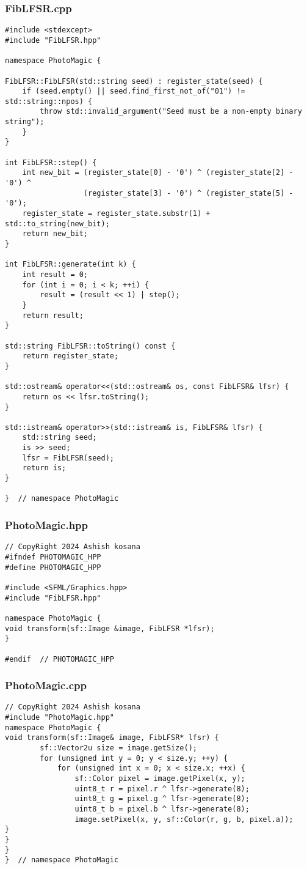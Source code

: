 \documentclass[12pt]{article}
\begin{document}
\subsubsection{FibLFSR.cpp}
\begin{lstlisting}[style=cppcode]
#include <stdexcept>
#include "FibLFSR.hpp"

namespace PhotoMagic {

FibLFSR::FibLFSR(std::string seed) : register_state(seed) {
    if (seed.empty() || seed.find_first_not_of("01") != std::string::npos) {
        throw std::invalid_argument("Seed must be a non-empty binary string");
    }
}

int FibLFSR::step() {
    int new_bit = (register_state[0] - '0') ^ (register_state[2] - '0') ^ 
                  (register_state[3] - '0') ^ (register_state[5] - '0');
    register_state = register_state.substr(1) + std::to_string(new_bit);
    return new_bit;
}

int FibLFSR::generate(int k) {
    int result = 0;
    for (int i = 0; i < k; ++i) {
        result = (result << 1) | step();
    }
    return result;
}

std::string FibLFSR::toString() const {
    return register_state;
}

std::ostream& operator<<(std::ostream& os, const FibLFSR& lfsr) {
    return os << lfsr.toString();
}

std::istream& operator>>(std::istream& is, FibLFSR& lfsr) {
    std::string seed;
    is >> seed;
    lfsr = FibLFSR(seed);
    return is;
}

}  // namespace PhotoMagic
\end{lstlisting}
\subsubsection{PhotoMagic.hpp}
\begin{lstlisting}[style=cppcode]
// CopyRight 2024 Ashish kosana
#ifndef PHOTOMAGIC_HPP
#define PHOTOMAGIC_HPP

#include <SFML/Graphics.hpp>
#include "FibLFSR.hpp"

namespace PhotoMagic {
void transform(sf::Image &image, FibLFSR *lfsr);
}

#endif  // PHOTOMAGIC_HPP

\end{lstlisting}
\subsubsection{PhotoMagic.cpp}
\begin{lstlisting}[style=cppcode]
// CopyRight 2024 Ashish kosana
#include "PhotoMagic.hpp"
namespace PhotoMagic {
void transform(sf::Image& image, FibLFSR* lfsr) {
        sf::Vector2u size = image.getSize();
        for (unsigned int y = 0; y < size.y; ++y) {
            for (unsigned int x = 0; x < size.x; ++x) {
                sf::Color pixel = image.getPixel(x, y);
                uint8_t r = pixel.r ^ lfsr->generate(8);
                uint8_t g = pixel.g ^ lfsr->generate(8);
                uint8_t b = pixel.b ^ lfsr->generate(8);
                image.setPixel(x, y, sf::Color(r, g, b, pixel.a));
}
}
}
}  // namespace PhotoMagic
\end{lstlisting}
\end{document}
